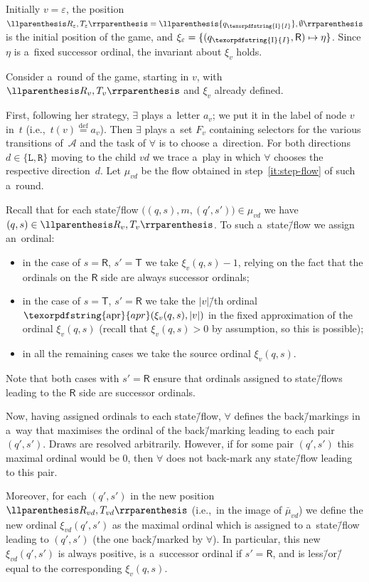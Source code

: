 \documentclass[11pt,a4paper]{amsart}
\theoremstyle{plain}
\theoremstyle{definition}
\theoremstyle{defC}
\theoremstyle{thmC}
\theoremstyle{plain}
\numberwithin{equation}{section}
\numberwithin{equation}{section}
\numberwithin{figure}{section}
\newcommand{\ident}[1]{\ensuremath{\texorpdfstring{\mathrm{\mathnm{#1}}}{#1}}\xspace}
\newcommand{\eqdef}{\stackrel{\text{def}}=}
\newcommand{\mathcalsym}[1]{\ensuremath{\mathcal{#1}}\xspace}
\newcommand{\CA}{\mathcalsym{A}}
\newcommand{\dL}{\mathtt{{\scriptstyle L}}}
\newcommand{\dR}{\mathtt{{\scriptstyle R}}}
\newcommand{\mathnm}[1]{#1}
\newcommand{\init}{\ident{I}}
\newcommand{\sT}{\mathsf{T}}
\newcommand{\sR}{\mathsf{R}}
\newcommand{\apr}{\ident{apr}}
\renewcommand\epsilon\varepsilon
\newcommand{\eve}{\ensuremath{\exists}\xspace}
\newcommand{\adam}{\ensuremath{\forall}\xspace}
\DeclarePairedDelimiter{\set}{\{}{\}}
\DeclarePairedDelimiter{\pair}{\llparenthesis}{\rrparenthesis}
\begin{document}
Initially $v=\epsilon$, the position $\pair{R_\epsilon, T_\epsilon}=\pair{\{q_\init\},\emptyset}$ is the initial position of the game, and $\xi_\epsilon=\set{(q_\init,\sR) \mapsto \eta}$.
Since $\eta$ is a~fixed successor ordinal, the invariant about $\xi_v$ holds.

Consider a~round of the game, starting in $v$, with $\pair{R_v, T_v}$ and $\xi_v$ already defined.

First, following her strategy, \eve plays a~letter $a_v$; we put it in the label of node $v$ in~$t$ (i.e.,~$t(v)\eqdef a_v$).
Then \eve plays a~set $F_v$ containing selectors for the various transitions of~$\CA$ and the task of \adam is to choose a~direction.
For both directions $d\in\{\dL,\dR\}$ moving to the child $vd$ we trace a~play in which \adam chooses the respective direction~$d$.
Let $\mu_{vd}$ be the flow obtained in step~\ref{it:step-flow} of such a~round.

Recall that for each state\=/flow $\big((q,s),m,(q',s')\big)\in\mu_{vd}$ we have $(q,s)\in\pair{R_v,T_v}$.
To such a~state\=/flow we assign an~ordinal:
\begin{itemize}
\item in the case of $s=\sR$, $s'=\sT$ we take $\xi_v(q,s)-1$, relying on the fact that the ordinals on the $\sR$ side are always successor ordinals;
\item in the case of $s=\sT$, $s'=\sR$ we take the $|v|$\=/th ordinal $\apr(\xi_v(q,s),|v|)$ in the fixed approximation of the ordinal $\xi_v(q,s)$ (recall that $\xi_v(q,s)>0$ by assumption, so this is possible);
\item in all the remaining cases we take the source ordinal $\xi_v(q,s)$.
\end{itemize}
\noindent %
Note that both cases with $s'=\sR$ ensure that ordinals assigned to state\=/flows leading to the $\sR$ side are successor ordinals.

Now, having assigned ordinals to each state\=/flow, \adam defines the back\=/markings in a~way that maximises the ordinal of the back\=/marking leading to each pair $(q',s')$.
Draws are resolved arbitrarily.
However, if for some pair $(q',s')$ this maximal ordinal would be $0$, then \adam does not back-mark any state\=/flow leading to this pair.

Moreover, for each $(q',s')$ in the new position $\pair{R_{vd},T_{vd}}$ (i.e.,~in the image of $\bar{\mu}_{vd}$)
we define the new ordinal $\xi_{vd}(q',s')$ as the maximal ordinal which is assigned to a~state\=/flow leading to $(q',s')$ (the one back\=/marked by \adam).
In particular, this new $\xi_{vd}(q',s')$ is always positive, is a~successor ordinal if $s'=\sR$, and is less\=/or\=/equal to the corresponding $\xi_v(q,s)$.
\end{document}
